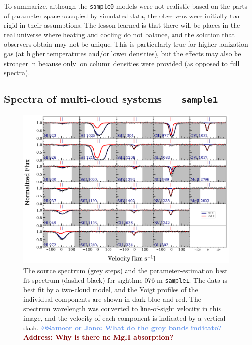 \documentclass[fleqn,usenatbib]{mnras}
\makeatletter
\newcommand{\todo}[1]{\textcolor{Maroon}{\textbf{Address: #1}}}
\newcommand{\atsameer}[1]{\textcolor{CornflowerBlue}{\textbf{@Sameer or Jane: #1}}}
\makeatother
\begin{document}
To summarize,
although the \texttt{sample0} models were not realistic based on the parts of parameter space occupied by simulated data, the observers were initially too rigid in their assumptions.
The lesson learned is that there will be places in the real universe where heating and cooling do not balance, and the solution that observers obtain may not be unique.
This is particularly true for higher ionization gas (at higher temperatures and/or lower densities),
but the effects may also be stronger in because only ion column densities were provided (as opposed to full spectra).

\subsection{Spectra of multi-cloud systems --- \texttt{sample1}}
\label{s: results -- sample1}

\begin{figure}
    \centering
    \includegraphics[width=\textwidth]{figures/sample1/Models_076.pdf}
    \caption{
    The source spectrum (grey steps) and the parameter-estimation best fit spectrum (dashed black) for sightline 076 in \texttt{sample1}.
    The data is best fit by a two-cloud model, and the Voigt profiles of the individual components are shown in dark blue and red.
    The spectrum wavelength was converted to line-of-sight velocity in this image,
    and the velocity of each component is indicated by a vertical dash.
    \atsameer{What do the grey bands indicate?}
    \todo{Why is there no MgII absorption?}
    }
    \label{f: sample1 spectrum}
\end{figure}
\end{document}
